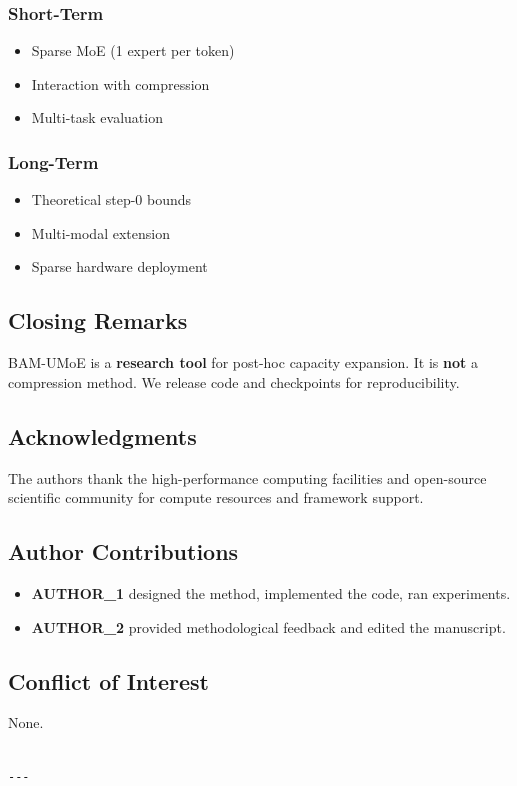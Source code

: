 \subsubsection{Short-Term}
\begin{itemize}
\item Sparse MoE (1 expert per token)
\item Interaction with compression
\item Multi-task evaluation

\end{itemize}
\subsubsection{Long-Term}
\begin{itemize}
\item Theoretical step-0 bounds
\item Multi-modal extension
\item Sparse hardware deployment

\end{itemize}
\subsection{Closing Remarks}

BAM-UMoE is a \textbf{research tool} for post-hoc capacity expansion. It is 
\textbf{not} a compression method. We release code and checkpoints for 
reproducibility.

\subsection{Acknowledgments}

The authors thank the high-performance computing facilities and open-source scientific community for compute resources and framework support.

\subsection{Author Contributions}

\begin{itemize}
\item \textbf{{{AUTHOR\_1}}} designed the method, implemented the code, ran experiments.
\item \textbf{{{AUTHOR\_2}}} provided methodological feedback and edited the manuscript.

\end{itemize}
\subsection{Conflict of Interest}

None.
\begin{lstlisting}

---
\end{lstlisting}